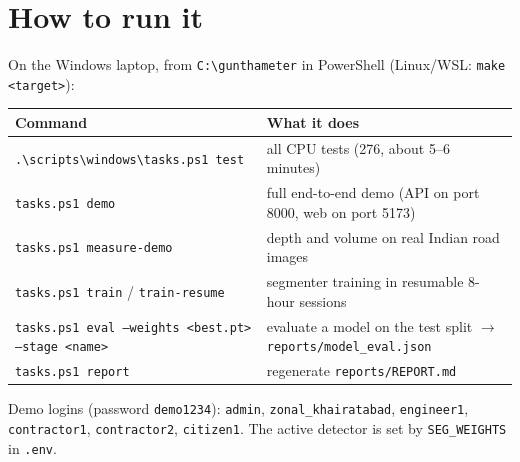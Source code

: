 \documentclass[11pt,a4paper]{article}
\newcommand{\code}[1]{\texttt{\small #1}}
\begin{document}
\section{How to run it}\label{sec:run}

On the Windows laptop, from \code{C:\textbackslash gunthameter} in PowerShell (Linux/WSL: \code{make <target>}):
\begin{center}
\small
\begin{tabularx}{\textwidth}{@{}l X@{}}
\toprule
\textbf{Command} & \textbf{What it does}\\
\midrule
\code{.\textbackslash scripts\textbackslash windows\textbackslash tasks.ps1 test} & all CPU tests (276, about 5--6 minutes)\\
\code{tasks.ps1 demo} & full end-to-end demo (API on port 8000, web on port 5173)\\
\code{tasks.ps1 measure-demo} & depth and volume on real Indian road images\\
\code{tasks.ps1 train} / \code{train-resume} & segmenter training in resumable 8-hour sessions\\
\code{tasks.ps1 eval --weights <best.pt> --stage <name>} & evaluate a model on the test split $\rightarrow$ \code{reports/model\_eval.json}\\
\code{tasks.ps1 report} & regenerate \code{reports/REPORT.md}\\
\bottomrule
\end{tabularx}
\end{center}
Demo logins (password \code{demo1234}): \code{admin}, \code{zonal\_khairatabad}, \code{engineer1}, \code{contractor1},
\code{contractor2}, \code{citizen1}. The active detector is set by \code{SEG\_WEIGHTS} in \code{.env}.

\appendix
\end{document}
